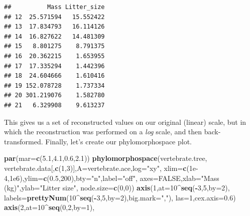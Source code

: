 \documentclass[fleqn,10pt,lineno]{wlpeerj}
\newenvironment{Shaded}{\begin{snugshade}}{\end{snugshade}}
\newcommand{\AttributeTok}[1]{\textcolor[rgb]{0.13,0.29,0.53}{#1}}
\newcommand{\ConstantTok}[1]{\textcolor[rgb]{0.56,0.35,0.01}{#1}}
\newcommand{\DecValTok}[1]{\textcolor[rgb]{0.00,0.00,0.81}{#1}}
\newcommand{\FloatTok}[1]{\textcolor[rgb]{0.00,0.00,0.81}{#1}}
\newcommand{\FunctionTok}[1]{\textcolor[rgb]{0.13,0.29,0.53}{\textbf{#1}}}
\newcommand{\NormalTok}[1]{#1}
\newcommand{\SpecialCharTok}[1]{\textcolor[rgb]{0.81,0.36,0.00}{\textbf{#1}}}
\newcommand{\StringTok}[1]{\textcolor[rgb]{0.31,0.60,0.02}{#1}}
\begin{document}
\begin{verbatim}
##          Mass Litter_size
## 12  25.571594   15.552422
## 13  17.834793   16.114126
## 14  16.827622   14.481309
## 15   8.801275    8.791375
## 16  20.362215    1.653955
## 17  17.335294    1.442396
## 18  24.604666    1.610416
## 19 152.078728    1.737334
## 20 301.219076    1.582780
## 21   6.329908    9.613237
\end{verbatim}

This gives us a set of reconstructed values on our original (linear)
scale, but in which the reconstruction was performed on a \emph{log}
scale, and then back-transformed. Finally, let's create our
phylomorphospace plot.

\begin{Shaded}
\begin{Highlighting}[]
\FunctionTok{par}\NormalTok{(}\AttributeTok{mar=}\FunctionTok{c}\NormalTok{(}\FloatTok{5.1}\NormalTok{,}\FloatTok{4.1}\NormalTok{,}\FloatTok{0.6}\NormalTok{,}\FloatTok{2.1}\NormalTok{))}
\FunctionTok{phylomorphospace}\NormalTok{(vertebrate.tree,}
\NormalTok{  vertebrate.data[,}\FunctionTok{c}\NormalTok{(}\DecValTok{1}\NormalTok{,}\DecValTok{3}\NormalTok{)],}\AttributeTok{A=}\NormalTok{vertebrate.ace,}\AttributeTok{log=}\StringTok{"xy"}\NormalTok{,}
  \AttributeTok{xlim=}\FunctionTok{c}\NormalTok{(}\FloatTok{1e{-}4}\NormalTok{,}\FloatTok{1e6}\NormalTok{),}\AttributeTok{ylim=}\FunctionTok{c}\NormalTok{(}\FloatTok{0.5}\NormalTok{,}\DecValTok{200}\NormalTok{),}\AttributeTok{bty=}\StringTok{"n"}\NormalTok{,}\AttributeTok{label=}\StringTok{"off"}\NormalTok{,}
  \AttributeTok{axes=}\ConstantTok{FALSE}\NormalTok{,}\AttributeTok{xlab=}\StringTok{"Mass (kg)"}\NormalTok{,}\AttributeTok{ylab=}\StringTok{"Litter size"}\NormalTok{,}
  \AttributeTok{node.size=}\FunctionTok{c}\NormalTok{(}\DecValTok{0}\NormalTok{,}\DecValTok{0}\NormalTok{))}
\FunctionTok{axis}\NormalTok{(}\DecValTok{1}\NormalTok{,}\AttributeTok{at=}\DecValTok{10}\SpecialCharTok{\^{}}\FunctionTok{seq}\NormalTok{(}\SpecialCharTok{{-}}\DecValTok{3}\NormalTok{,}\DecValTok{5}\NormalTok{,}\AttributeTok{by=}\DecValTok{2}\NormalTok{),}
  \AttributeTok{labels=}\FunctionTok{prettyNum}\NormalTok{(}\DecValTok{10}\SpecialCharTok{\^{}}\FunctionTok{seq}\NormalTok{(}\SpecialCharTok{{-}}\DecValTok{3}\NormalTok{,}\DecValTok{5}\NormalTok{,}\AttributeTok{by=}\DecValTok{2}\NormalTok{),}\AttributeTok{big.mark=}\StringTok{","}\NormalTok{),}
  \AttributeTok{las=}\DecValTok{1}\NormalTok{,}\AttributeTok{cex.axis=}\FloatTok{0.6}\NormalTok{)}
\FunctionTok{axis}\NormalTok{(}\DecValTok{2}\NormalTok{,}\AttributeTok{at=}\DecValTok{10}\SpecialCharTok{\^{}}\FunctionTok{seq}\NormalTok{(}\DecValTok{0}\NormalTok{,}\DecValTok{2}\NormalTok{,}\AttributeTok{by=}\DecValTok{1}\NormalTok{),}

\end{Highlighting}
\end{Shaded}
\end{document}
